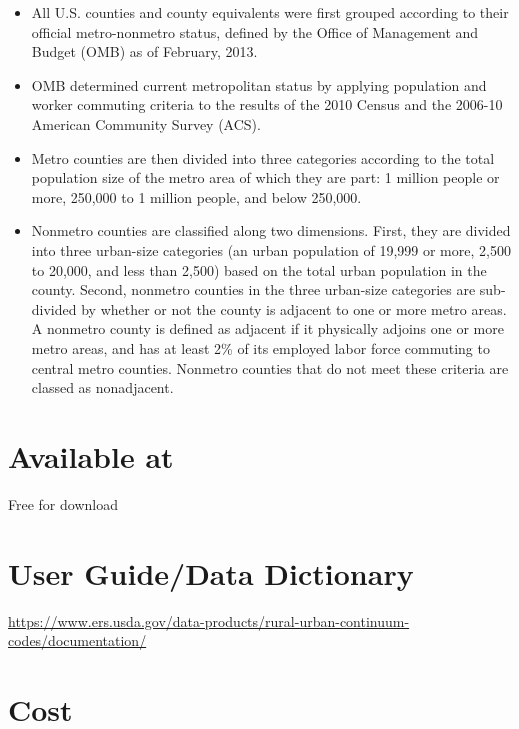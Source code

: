 \documentclass[
]{book}
\providecommand{\tightlist}{%
  \setlength{\itemsep}{0pt}\setlength{\parskip}{0pt}}
\begin{document}
\begin{itemize}
\tightlist
\item
  All U.S. counties and county equivalents were first grouped according to their official metro-nonmetro status, defined by the Office of Management and Budget (OMB) as of February, 2013.
\item
  OMB determined current metropolitan status by applying population and worker commuting criteria to the results of the 2010 Census and the 2006-10 American Community Survey (ACS).
\item
  Metro counties are then divided into three categories according to the total population size of the metro area of which they are part: 1 million people or more, 250,000 to 1 million people, and below 250,000.
\item
  Nonmetro counties are classified along two dimensions. First, they are divided into three urban-size categories (an urban population of 19,999 or more, 2,500 to 20,000, and less than 2,500) based on the total urban population in the county. Second, nonmetro counties in the three urban-size categories are sub- divided by whether or not the county is adjacent to one or more metro areas. A nonmetro county is defined as adjacent if it physically adjoins one or more metro areas, and has at least 2\% of its employed labor force commuting to central metro counties. Nonmetro counties that do not meet these criteria are classed as nonadjacent.
\end{itemize}

\hypertarget{available-at-74}{%
\section{Available at}\label{available-at-74}}

Free for download

\hypertarget{user-guidedata-dictionary-74}{%
\section{User Guide/Data Dictionary}\label{user-guidedata-dictionary-74}}

\url{https://www.ers.usda.gov/data-products/rural-urban-continuum-codes/documentation/}

\hypertarget{cost-74}{%
\section{Cost}\label{cost-74}}
\end{document}
